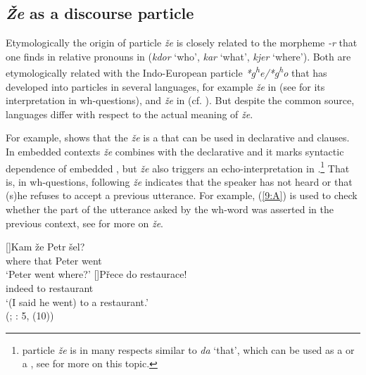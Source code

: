 \documentclass[output=paper,modfonts,newtxmath,hidelinks]{langscibook}
\begin{document}
\subsection{\textit{Že} as a discourse particle}

Etymologically the origin of  particle \textit{že} is closely related to the morpheme \textit{-r} that one finds in relative pronouns in  (\textit{kdor} `who', \textit{kar} `what', \textit{kjer} `where'). Both are etymologically related with the Indo-European particle \textit{*g\textsuperscript{h}e/*g\textsuperscript{h}o} that has developed into particles in several  languages, for example \textit{že} in  (see \citealt{hagstrommccoy2003} for its interpretation in wh-questions), and \textit{že} in  \citep{skrabalova2012} (cf. \citealt{mitrovic2016benj}). But despite the common source, languages differ with respect to the actual meaning of \textit{že}.\enlargethispage{8pt}

For example, \cite{skrabalova2012} shows that the  \textit{že} is a  that can be used in declarative and  clauses. In embedded contexts \textit{že} combines with the declarative  and it marks syntactic dependence of embedded , but \textit{že} also triggers an echo-interpretation in .\footnote{ particle \textit{že} is in many respects similar to  \textit{da} `that', which can be used as a  or a , see \cite{marusicetal2015} for more on this topic.} That is, in wh-questions, following \cite{skrabalova2012} \textit{že} indicates that the speaker has not heard or that (s)he refuses to accept a previous utterance. For example, (\ref{9:A}) is used to check whether the part of the utterance asked by the wh-word was asserted in the previous context, see \cite{skrabalova2012} for more on  \textit{že}.

\begin{exe} 
\ex\label{9:A}
\begin{xlist}
[]{\gll Kam  že Petr šel?\\
 	 where that Peter went\\
\glt `Peter went where?'}
[]{\gll Přece do restaurace! \\
	 indeed to restaurant \\
\glt `(I said he went) to a restaurant.'\\
\hfill (; \citealt{skrabalova2012}: 5, (10))}
\end{xlist}
\end{exe}
\end{document}
